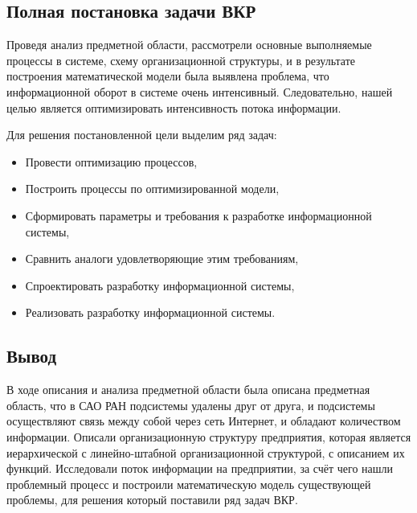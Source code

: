 \subsection{Полная постановка задачи ВКР}
Проведя анализ предметной области, рассмотрели основные выполняемые процессы в системе, схему организационной структуры, и в результате построения математической модели была выявлена проблема, что информационной оборот в системе очень интенсивный. Следовательно, нашей целью является оптимизировать интенсивность потока информации.

Для решения постановленной цели выделим ряд задач:
\begin{itemize}
	\item Провести оптимизацию процессов,
	\item Построить процессы по оптимизированной модели,
	\item Сформировать параметры и требования к разработке информационной системы,
	\item Сравнить аналоги удовлетворяющие этим требованиям,
	\item Спроектировать разработку информационной системы,
	\item Реализовать разработку информационной системы.
\end{itemize}

\subsection{Вывод}
В ходе описания и анализа предметной области была описана предметная область, что в САО РАН подсистемы удалены друг от друга, и подсистемы осуществляют связь между собой через сеть Интернет, и обладают количеством информации. Описали организационную структуру предприятия, которая является 
иерархической с линейно-штабной организационной структурой, с описанием их функций. Исследовали поток информации на предприятии, за счёт чего нашли проблемный процесс и построили математическую модель существующей проблемы, для решения который поставили ряд задач ВКР.
\pagebreak